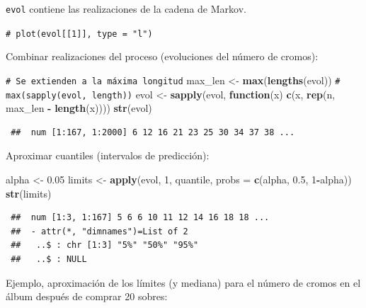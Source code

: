 \documentclass[
  spanish,
  10pt,
]{book}
\newenvironment{Shaded}{\begin{snugshade}}{\end{snugshade}}
\newcommand{\AttributeTok}[1]{\textcolor[rgb]{0.13,0.29,0.53}{#1}}
\newcommand{\CommentTok}[1]{\textcolor[rgb]{0.56,0.35,0.01}{\textit{#1}}}
\newcommand{\ControlFlowTok}[1]{\textcolor[rgb]{0.13,0.29,0.53}{\textbf{#1}}}
\newcommand{\DecValTok}[1]{\textcolor[rgb]{0.00,0.00,0.81}{#1}}
\newcommand{\FloatTok}[1]{\textcolor[rgb]{0.00,0.00,0.81}{#1}}
\newcommand{\FunctionTok}[1]{\textcolor[rgb]{0.13,0.29,0.53}{\textbf{#1}}}
\newcommand{\NormalTok}[1]{#1}
\newcommand{\OtherTok}[1]{\textcolor[rgb]{0.56,0.35,0.01}{#1}}
\newcommand{\SpecialCharTok}[1]{\textcolor[rgb]{0.81,0.36,0.00}{\textbf{#1}}}
\theoremstyle{break}
\theoremstyle{nonumberplain}
\renewcommand{\CommentTok}[1]{\textcolor[rgb]{0.41,0.41,0.41}{\texttt{#1}}}
\begin{document}
\texttt{evol} contiene las realizaciones de la cadena de Markov.

\begin{Shaded}
\begin{Highlighting}[]
\CommentTok{\# plot(evol[[1]], type = "l")}
\end{Highlighting}
\end{Shaded}

Combinar realizaciones del proceso (evoluciones del número de cromos):

\begin{Shaded}
\begin{Highlighting}[]
\CommentTok{\# Se extienden a la máxima longitud}
\NormalTok{max\_len }\OtherTok{\textless{}{-}} \FunctionTok{max}\NormalTok{(}\FunctionTok{lengths}\NormalTok{(evol)) }\CommentTok{\# max(sapply(evol, length))}
\NormalTok{evol }\OtherTok{\textless{}{-}} \FunctionTok{sapply}\NormalTok{(evol, }\ControlFlowTok{function}\NormalTok{(x) }\FunctionTok{c}\NormalTok{(x, }\FunctionTok{rep}\NormalTok{(n, max\_len }\SpecialCharTok{{-}} \FunctionTok{length}\NormalTok{(x))))}
\FunctionTok{str}\NormalTok{(evol)}
\end{Highlighting}
\end{Shaded}

\begin{verbatim}
 ##  num [1:167, 1:2000] 6 12 16 21 23 25 30 34 37 38 ...
\end{verbatim}

Aproximar cuantiles (intervalos de predicción):

\begin{Shaded}
\begin{Highlighting}[]
\NormalTok{alpha }\OtherTok{\textless{}{-}} \FloatTok{0.05}
\NormalTok{limits }\OtherTok{\textless{}{-}} \FunctionTok{apply}\NormalTok{(evol, }\DecValTok{1}\NormalTok{, quantile, }\AttributeTok{probs =} \FunctionTok{c}\NormalTok{(alpha, }\FloatTok{0.5}\NormalTok{, }\DecValTok{1}\SpecialCharTok{{-}}\NormalTok{alpha))}
\FunctionTok{str}\NormalTok{(limits)}
\end{Highlighting}
\end{Shaded}

\begin{verbatim}
 ##  num [1:3, 1:167] 5 6 6 10 11 12 14 16 18 18 ...
 ##  - attr(*, "dimnames")=List of 2
 ##   ..$ : chr [1:3] "5%" "50%" "95%"
 ##   ..$ : NULL
\end{verbatim}

Ejemplo, aproximación de los límites (y mediana) para el número de cromos en el álbum después de comprar 20 sobres:
\end{document}
